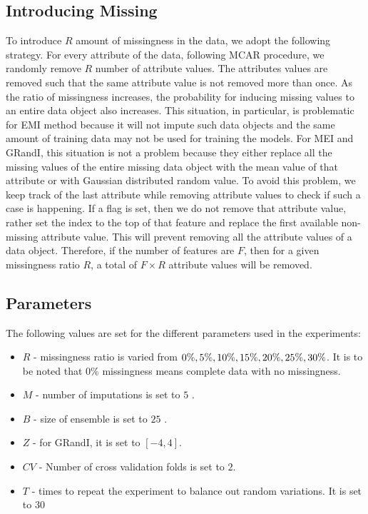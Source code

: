\documentclass{iosart2c}
\begin{document}
\subsection{Introducing Missing}
To introduce $R$ amount of missingness in the data, we adopt the following strategy. For every attribute of the data, following MCAR procedure, we randomly remove $R$ number of attribute values. The attributes values are removed such that the same attribute value is not removed more than once.  As the ratio of missingness increases, the probability for inducing missing values to an entire data object also increases. This situation, in particular, is problematic for EMI method because it will not impute such data objects and the same amount of training data may not be used for training the models. For MEI and GRandI, this situation is not a problem because they either replace all the missing values of the entire missing data object with the mean value of that attribute or with Gaussian distributed random value. To avoid this problem, we keep track of the last attribute while removing attribute values to check if such a case is happening. If a flag is set, then we do not remove that attribute value, rather set the index to the top of that feature and replace the first available non-missing attribute value. This will prevent removing all the attribute values of a data object.  
Therefore, if the number of features are $F$, then for a given missingness ratio $R$, a total of $F\times R$ attribute values will be removed. 

\subsection{Parameters}
The following values are set for the different parameters used in the experiments:
\begin{itemize}[label=\textbullet]
\item $R$ - missingness ratio is varied from $0\%, 5\%, 10\%,
\\15\%, 20\%, 25\%, 30\%$. It is to be noted that $0\%$ missingness means complete data with no missingness.
\item $M$ - number of imputations is set to $5$ \cite{khan2012bayesian}.
\item $B$ - size of ensemble is set to $25$ \cite{kuncheva2007classifier}.
\item $Z$ - for GRandI, it is set to $[-4, 4]$.
\item $CV$ - Number of cross validation folds is set to $2$.
\item $T$ - times to repeat the experiment to balance out random variations. It is set to $30$
\end{itemize}
\end{document}

